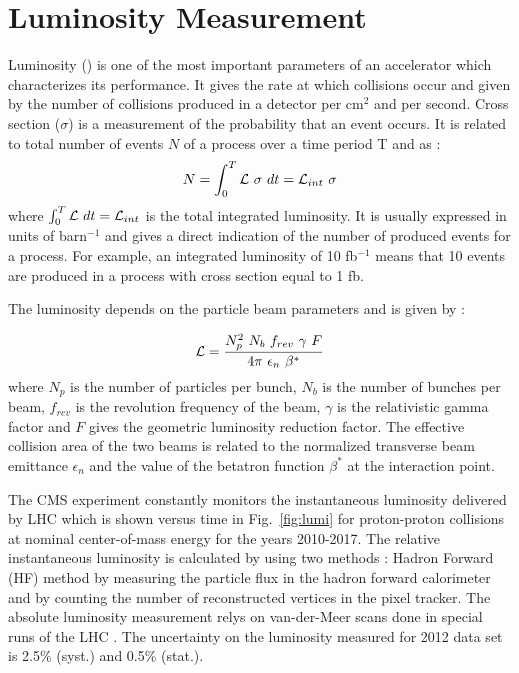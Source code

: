 \section{Luminosity Measurement}
Luminosity (\lumi) is one of the most important parameters of an accelerator which characterizes its performance. It gives the rate at which collisions occur and given by the number of collisions produced in a detector per cm$^2$ and per second. Cross section ($\sigma$) is a measurement of the probability that an event occurs. It is related to total number of events $N$ of a process over a time period T and \lumi as :
\begin{equation}
N = \int_{0}^{T} \mathcal{L}~\sigma~dt = \mathcal{L}_{int}~\sigma
\end{equation}
where $\int_{0}^{T} \mathcal{L}~dt = \mathcal{L}_{int}$ is the total integrated luminosity. It is usually expressed in units of barn$^{-1}$ and gives a direct indication of the number of produced events for a process. For example, an integrated luminosity of 10 fb$^{-1}$ means that 10 events are produced in a process with cross section equal to 1 fb.

The luminosity depends on the particle beam parameters and is given by :

\begin{equation}
\lumi = \frac{N^2_p~N_b~f_{rev}~\gamma~F}{4\pi~\epsilon_n~\beta^*}
\end{equation}
where $N_p$ is the number of particles per bunch, $N_b$ is the number of bunches per beam, $f_{rev}$ is the revolution frequency of the beam, $\gamma$ is the relativistic gamma factor and $F$ gives the geometric luminosity reduction factor. The effective collision area of the two beams is related to the normalized transverse beam emittance $\epsilon_n$ and the value of the betatron function $ \beta^*$ at the interaction point.
 
The CMS experiment constantly monitors the instantaneous luminosity delivered by LHC which is shown versus time in Fig.~\ref{fig:lumi} for proton-proton collisions at nominal center-of-mass energy for the years 2010-2017. The relative instantaneous luminosity is calculated by using two methods \cite{CMS:2013gfa} : Hadron Forward (HF) method by measuring the particle flux in the hadron forward calorimeter and by counting the number of reconstructed vertices in the pixel tracker. The absolute luminosity measurement relys on van-der-Meer scans done in special runs of the LHC \cite{vanderMeer:1968zz}. The uncertainty on the luminosity measured for 2012 data set is 2.5\% (syst.) and 0.5\% (stat.).

